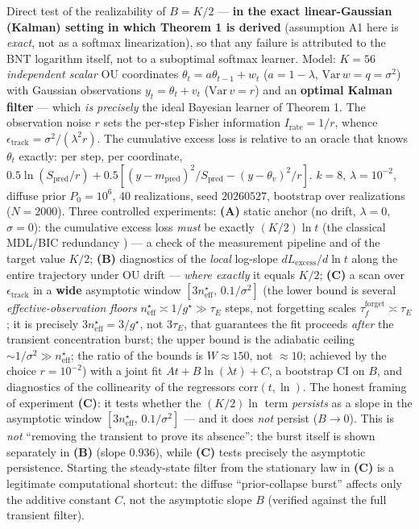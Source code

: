 \documentclass[12pt]{iopart}
\begin{document}
Direct test of the realizability of \(B = K/2\) --- \textbf{in the exact linear-Gaussian (Kalman) setting in which Theorem 1 is derived} (assumption A1 here is \emph{exact}, not as a softmax linearization), so that any failure is attributed to the BNT logarithm itself, not to a suboptimal softmax learner. Model: \(K = 56\) \emph{independent scalar} OU coordinates \(\theta_t = a\theta_{t-1} + w_t\) (\(a = 1-\lambda\), \(\mathrm{Var}\,w = q = \sigma^2\)) with Gaussian observations \(y_t = \theta_t + v_t\) (\(\mathrm{Var}\,v = r\)) and an \textbf{optimal Kalman filter} --- which \emph{is precisely} the ideal Bayesian learner of Theorem 1. The observation noise \(r\) sets the per-step Fisher information \(I_{\text{rate}} = 1/r\), whence \(\epsilon_{\text{track}} = \sigma^2/(\lambda^2 r)\). The cumulative excess loss is relative to an oracle that knows \(\theta_t\) exactly: per step, per coordinate, \(0.5\ln(S_{\text{pred}}/r) + 0.5[(y-m_{\text{pred}})^2/S_{\text{pred}} - (y-\theta_v)^2/r]\). \(k = 8\), \(\lambda = 10^{-2}\), diffuse prior \(P_0 = 10^6\), 40 realizations, seed \(20260527\), bootstrap over realizations (\(N = 2000\)). Three controlled experiments: \textbf{(A)} static anchor (no drift, \(\lambda = 0\), \(\sigma = 0\)): the cumulative excess loss \emph{must} be exactly \((K/2)\ln t\) (the classical MDL/BIC redundancy \cite{Rissanen1986,ClarkeBarron1990}) --- a check of the measurement pipeline and of the target value \(K/2\); \textbf{(B)} diagnostics of the \emph{local} log-slope \(dL_{\text{excess}}/d\ln t\) along the entire trajectory under OU drift --- \emph{where exactly} it equals \(K/2\); \textbf{(C)} a scan over \(\epsilon_{\text{track}}\) in a \textbf{wide} asymptotic window \([3n_{\text{eff}}^\star,\,0.1/\sigma^2]\) (the lower bound is several \emph{effective-observation floors} \(n_{\text{eff}}^\star\asymp 1/g^\star \gg \tau_E\) steps, not forgetting scales \(\tau_f^{\text{forget}}\asymp\tau_E\); it is precisely \(3n_{\text{eff}}^\star = 3/g^\star\), not \(3\tau_E\), that guarantees the fit proceeds \emph{after} the transient concentration burst; the upper bound is the adiabatic ceiling \(\sim 1/\sigma^2 \gg n_{\text{eff}}^\star\); the ratio of the bounds is \(W \approx 150\), not \(\approx 10\); achieved by the choice \(r = 10^{-2}\)) with a joint fit \(A t + B\ln(\lambda t) + C\), a bootstrap CI on \(B\), and diagnostics of the collinearity of the regressors \(\mathrm{corr}(t,\ln)\). The honest framing of experiment \textbf{(C)}: it tests whether the \((K/2)\ln\) term \emph{persists} as a slope in the asymptotic window \([3n_{\text{eff}}^\star,\,0.1/\sigma^2]\) --- and it does \emph{not} persist (\(B \to 0\)). This is \emph{not} ``removing the transient to prove its absence'': the burst itself is shown separately in \textbf{(B)} (slope \(0.936\)), while \textbf{(C)} tests precisely the asymptotic persistence. Starting the steady-state filter from the stationary law in \textbf{(C)} is a legitimate computational shortcut: the diffuse ``prior-collapse burst'' affects only the additive constant \(C\), not the asymptotic slope \(B\) (verified against the full transient filter).
\end{document}
